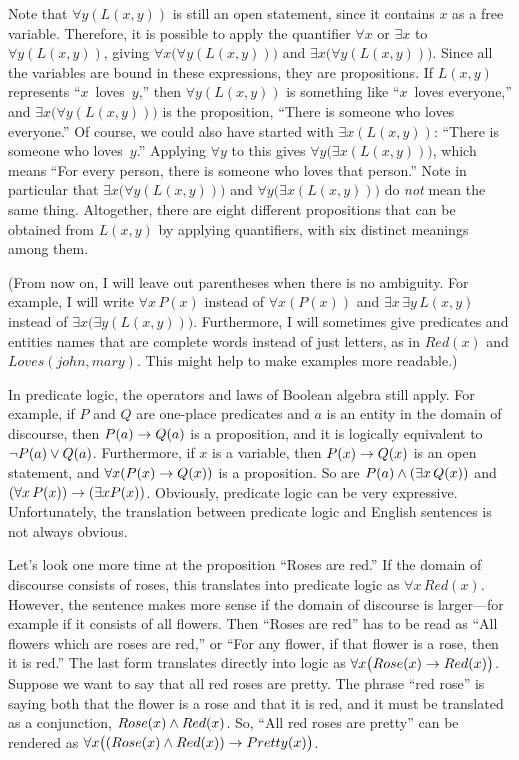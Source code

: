 Note that $\forall y(L(x,y))$ is still an open statement, since
it contains $x$ as a free variable.
Therefore, it is possible to
apply the quantifier $\forall x$ or $\exists x$ to $\forall y(L(x,y))$,
giving $\forall x\big(\forall y(L(x,y))\big)$ and
$\exists x\big(\forall y(L(x,y))\big)$.  Since all the variables are
bound in these expressions, they are propositions.  If $L(x,y)$ represents
``$x$~loves~$y$,'' then $\forall y(L(x,y))$ is something like ``$x$~loves
everyone,''  and $\exists x\big(\forall y(L(x,y))\big)$ is the
proposition, ``There is someone who loves everyone.''  Of course, we
could also have started with $\exists x(L(x,y))$: ``There is someone
who loves~$y$.''  Applying $\forall y$ to this gives 
$\forall y\big(\exists x(L(x,y))\big)$,
which means ``For every person, there is someone who loves that person.''
Note in particular that $\exists x\big(\forall y(L(x,y))\big)$ and
$\forall y\big(\exists x(L(x,y))\big)$ do \emph{not} mean the same thing.
Altogether, there are eight different propositions that can
be obtained from $L(x,y)$ by applying quantifiers, with six distinct
meanings among them.

(From now on, I will leave out parentheses when there is no ambiguity.
For example, I will write $\forall x\, P(x)$ instead of $\forall x(P(x))$
and $\exists x\,\exists y\,L(x,y)$ instead of
$\exists x\big(\exists y(L(x,y))\big)$.  Furthermore, I will
sometimes give predicates and entities names that are complete words
instead of just letters, as in  $Red(x)$ and $Loves(john,mary)$.
This might help to make examples more readable.)

\medbreak

In predicate logic, the operators and laws of Boolean algebra still
apply.  For example, if $P$ and $Q$ are one-place predicates and
$a$ is an entity in the domain of discourse, then $P(a)\rightarrow Q(a)$
is a proposition, and it is logically equivalent to $\lnot P(a)\vee Q(a)$.
Furthermore, if $x$ is a variable, then $P(x)\rightarrow Q(x)$ is an open
statement, and $\forall x(P(x)\rightarrow Q(x))$ is a proposition.
So are $P(a)\wedge(\exists x\,Q(x))$ and $(\forall x\,P(x))\rightarrow(\exists xP(x))$.
Obviously, predicate logic can be very expressive.  Unfortunately,
the translation between predicate logic and English sentences is not
always obvious.

Let's look one more time at the proposition ``Roses are red.''
If the domain of discourse consists of roses, this translates into
predicate logic as $\forall x\, Red(x)$.  However, the sentence makes
more sense if the domain of discourse is larger---for example if it
consists of all flowers.  Then ``Roses are red'' has to be read as
``All flowers which are roses are red,'' or ``For any flower,
if that flower is a rose, then it is red.'' The last form translates
directly into logic as $\forall x\big(Rose(x)\rightarrow Red(x)\big)$.
Suppose we want to say that all red roses are pretty.  The phrase
``red rose'' is saying both that the flower is a rose and that it is
red, and it must be translated as a conjunction, $Rose(x)\wedge Red(x)$.
So, ``All red roses are pretty'' can be rendered as
$\forall x\big((Rose(x)\wedge Red(x))\rightarrow Pretty(x)\big)$.

